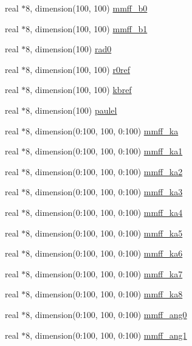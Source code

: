 \begin{DoxyCompactItemize}
\item 
real $\ast$8, dimension(100, 100) \hyperlink{classmerck_ae69e878a1f3cb3cbb3d6daae813627dd}{mmff\-\_\-b0}
\item 
real $\ast$8, dimension(100, 100) \hyperlink{classmerck_aa90ea277f5b16112bf0affb6a613206e}{mmff\-\_\-b1}
\item 
real $\ast$8, dimension(100) \hyperlink{classmerck_a0d1de87ac7a02686e788c3d0bc717928}{rad0}
\item 
real $\ast$8, dimension(100, 100) \hyperlink{classmerck_a74fb8d2edab6da02dff237cadce84dc1}{r0ref}
\item 
real $\ast$8, dimension(100, 100) \hyperlink{classmerck_ae5cbcf22c0de8f2db0f3f0861da0a0c0}{kbref}
\item 
real $\ast$8, dimension(100) \hyperlink{classmerck_ad13da23eb43bf51f1ba2c113f2b808ba}{paulel}
\item 
real $\ast$8, dimension(0\-:100, 100, 0\-:100) \hyperlink{classmerck_a8fa0ce7da7f6b22c4f17f7d3c34740fd}{mmff\-\_\-ka}
\item 
real $\ast$8, dimension(0\-:100, 100, 0\-:100) \hyperlink{classmerck_a2cfea46a3328ecb5361185efa845173f}{mmff\-\_\-ka1}
\item 
real $\ast$8, dimension(0\-:100, 100, 0\-:100) \hyperlink{classmerck_a2638860ef441294586104f06567d3d86}{mmff\-\_\-ka2}
\item 
real $\ast$8, dimension(0\-:100, 100, 0\-:100) \hyperlink{classmerck_ada5eeb62ef38993fe50aa8a6deef0efb}{mmff\-\_\-ka3}
\item 
real $\ast$8, dimension(0\-:100, 100, 0\-:100) \hyperlink{classmerck_ae724496a18c156c3d42e779c5a9090a0}{mmff\-\_\-ka4}
\item 
real $\ast$8, dimension(0\-:100, 100, 0\-:100) \hyperlink{classmerck_a2a3aaed35edbf54ad9f93fc1efc3ed31}{mmff\-\_\-ka5}
\item 
real $\ast$8, dimension(0\-:100, 100, 0\-:100) \hyperlink{classmerck_a1f8811f68739a037f88c704f17379501}{mmff\-\_\-ka6}
\item 
real $\ast$8, dimension(0\-:100, 100, 0\-:100) \hyperlink{classmerck_a674c2b487209fdd0745881cab7d6c516}{mmff\-\_\-ka7}
\item 
real $\ast$8, dimension(0\-:100, 100, 0\-:100) \hyperlink{classmerck_a7302e61e27f36aad1c7545fb79f3b5c3}{mmff\-\_\-ka8}
\item 
real $\ast$8, dimension(0\-:100, 100, 0\-:100) \hyperlink{classmerck_a7559877141f1b4be50c6856d173ea031}{mmff\-\_\-ang0}
\item 
real $\ast$8, dimension(0\-:100, 100, 0\-:100) \hyperlink{classmerck_a2ab0358d1ee3adc246ee70ba552fe348}{mmff\-\_\-ang1}

\end{DoxyCompactItemize}
